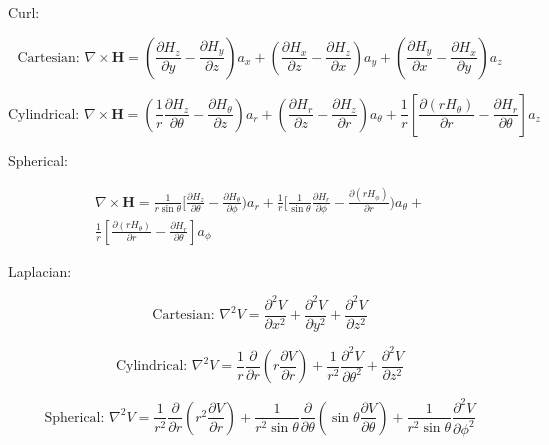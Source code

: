 \documentclass[a4paper]{article}
\begin{document}
{\large Curl:}

\begin{displaymath}
\textrm{Cartesian: }
\nabla \times \mathbf H =
(\frac{\partial H_z}{\partial y} - \frac{\partial H_y}{\partial z}) a_x +
(\frac{\partial H_x}{\partial z} - \frac{\partial H_z}{\partial x}) a_y +
(\frac{\partial H_y}{\partial x} - \frac{\partial H_x}{\partial y}) a_z
\end{displaymath}

\begin{displaymath}
\textrm{Cylindrical: }
\nabla \times \mathbf H =
(\frac 1 r \frac{\partial H_z}{\partial \theta} - \frac{\partial
H_\theta}{\partial z}) a_r +
(\frac{\partial H_r}{\partial z} - \frac{\partial H_z}{\partial
r}) a_\theta +
\frac 1 r [\frac{\partial (r H_\theta)}{\partial r} -
\frac{\partial H_r}{\partial \theta}] a_z
\end{displaymath}

Spherical:

\begin{eqnarray}
\nabla \times \mathbf H = 
\frac 1 {r\sin \theta} [ \frac{\partial H_z}{\partial \theta} -
\frac{\partial
H_\theta}{\partial \phi}) a_r + 
\frac 1 r [
\frac 1 {\sin\theta}
\frac{\partial H_r}{\partial \phi} - \frac{\partial(rH_\phi)}{\partial
r}) a_\theta +
{}\nonumber\\
\frac 1 r [\frac{\partial (r H_\theta)}{\partial r} -
\frac{\partial H_r}{\partial \theta}] a_\phi
\nonumber
\end{eqnarray}

{\large Laplacian:}

\begin{displaymath}
\textrm{Cartesian: }
\nabla^2 V = 
\frac{\partial ^2 V}{\partial x^2} +
\frac{\partial ^2 V}{\partial y^2} +
\frac{\partial ^2 V}{\partial z^2} 
\end{displaymath}

\begin{displaymath}
\textrm{Cylindrical: }
\nabla^2 V = 
\frac 1 r
\frac \partial {\partial r}
(r \frac{\partial V}{\partial r} ) +
\frac 1 {r^2}
\frac {\partial^2V} {\partial \theta^2} +
\frac{\partial ^2 V}{\partial z^2} 
\end{displaymath}

\begin{displaymath}
\textrm{Spherical: }
\nabla ^2 V =
\frac 1 {r^2}
\frac \partial {\partial r}
(r^2 \frac{\partial V}{\partial r} )+
\frac 1 {r^2 \sin\theta}
\frac \partial {\partial \theta}
( \sin\theta \frac{\partial V}{\partial \theta}) +
\frac 1 {r^2 \sin\theta}
\frac{\partial^2 V}{\partial\phi^2} 
\end{displaymath}
\end{document}
